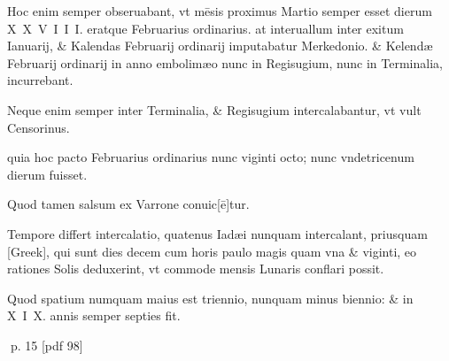 \begin{parnumbers}
Hoc enim semper obseruabant, vt mēsis proximus Martio semper esset dierum X X V I I I. eratque Februarius ordinarius. at interuallum inter exitum Ianuarij, \& Kalendas Februarij ordinarij imputabatur Merkedonio. \& Kelendæ Februarij ordinarij in anno embolimæo nunc in Regisugium, nunc in Terminalia, incurrebant.

Neque enim semper inter Terminalia, \& Regisugium intercalabantur, vt vult Censorinus. 

quia hoc pacto Februarius ordinarius nunc viginti octo; nunc vndetricenum dierum fuisset.

Quod tamen salsum ex Varrone conuic[ē]tur.

Tempore differt intercalatio, quatenus Iadæi nunquam intercalant, priusquam \textgreek{[Greek]}, qui sunt dies decem cum horis paulo magis quam vna \& viginti, eo rationes Solis deduxerint, vt commode mensis Lunaris conflari possit.

Quod spatium numquam maius est triennio, nunquam minus biennio: \& in X I X. annis semper septies fit.

\end{parnumbers}
\clearpage
p. 15 [pdf 98]


